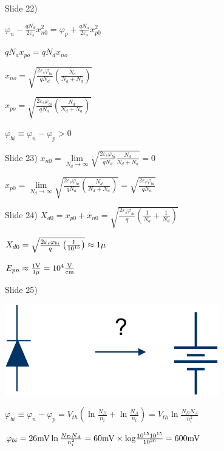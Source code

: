 \documentclass{beamer}
\begin{document}
 \begin{frame}{Slide 22)}

 ${\varphi _n} - \frac{{q{N_d}}}{{2{\varepsilon _s}}}x_{n0}^2 = {\varphi _p} + \frac{{q{N_a}}}{{2{\varepsilon _s}}}x_{p0}^2$

 $q{N_a}{x_{po}} = q{N_d}{x_{no}}$

 ${x_{no}} = \sqrt {\frac{{2{\varepsilon _s}{\varphi _{bi}}}}{{qN_d^{}}}\left( {\frac{{{N_a}}}{{{N_a} + {N_d}}}} \right)} $

 ${x_{po}} = \sqrt {\frac{{2{\varepsilon _s}{\varphi _{bi}}}}{{qN_a^{}}}\left( {\frac{{{N_d}}}{{{N_d} + {N_a}}}} \right)} $

 ${\varphi _{bi}} \equiv {\varphi _n} - {\varphi _p} > 0$

 \end{frame}
 
\begin{frame}{Slide 23)}
 ${x_{n0}} = \mathop {\lim }\limits_{{N_d} \to \infty } \sqrt {\frac{{2{\varepsilon _s}{\varphi _{bi}}}}{{qN_d^{}}}\frac{{{N_d}}}{{{N_d} + {N_a}}}}  = 0$
 
 ${x_{p0}} = \mathop {\lim }\limits_{{N_d} \to \infty } \sqrt {\frac{{2{\varepsilon _s}{\varphi _{bi}}}}{{qN_a^{}}}\left( {\frac{{{N_d}}}{{{N_d} + {N_a}}}} \right)}  = \sqrt {\frac{{2{\varepsilon _s}{\varphi _{bi}}}}{{qN_a^{}}}} $
\end{frame}

\begin{frame}{Slide 24)}
 ${X_{d0}} = {x_{p0}} + {x_{n0}} = \sqrt {\frac{{2{\varepsilon _s}{\varphi _{bi}}}}{q}\left( {\frac{1}{{{N_a}}} + \frac{1}{{{N_d}}}} \right)} $
 
 ${X_{d0}} = \sqrt {\frac{{2{\varepsilon _s}{\varphi _{bi}}}}{q}\left( {\frac{1}{{{{10}^{15}}}}} \right)}  \approx 1{\rm{\mu }}$
 
 ${E_{pn}} \approx \frac{{1{\rm{V}}}}{{1{\rm{\mu }}}} = {10^4}\frac{{\rm{V}}}{{{\rm{cm}}}}$
\end{frame}

\begin{frame}{Slide 25)}

\includegraphics[width=.6\columnwidth]{slide25}

 ${\varphi _{bi}} \equiv {\varphi _n} - {\varphi _p} = {V_{th}}\left( {\ln \frac{{{N_D}}}{{{n_i}}} + \ln \frac{{{N_A}}}{{{n_i}}}} \right) = {V_{th}}\ln \frac{{{N_D}{N_A}}}{{n_i^2}}$
 
 ${\varphi _{bi}} = 26{\rm{mV}}\ln \frac{{{N_D}{N_A}}}{{n_i^2}} = 60{\rm{mV}} \times {\rm{log}}\frac{{{\rm{1}}{{\rm{0}}^{{\rm{15}}}}{{10}^{15}}}}{{{{10}^{20}}}} = 600{\rm{mV}}$
\end{frame}
\end{document}
